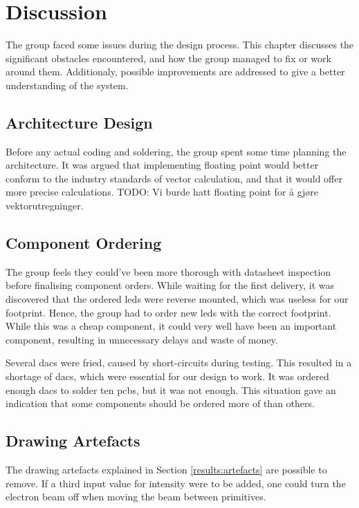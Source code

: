 \chapter{Discussion}

The group faced some issues during the design process. 
This chapter discusses the significant obstacles encountered, and how the group managed to fix or work around them. 
Additionaly, possible improvements are addressed to give a better understanding of the system.

\section{Architecture Design}
Before any actual coding and soldering, the group spent some time planning the architecture.
It was argued that implementing floating point would better conform to the industry standards of vector calculation, and that it would offer more precise calculations.
TODO: Vi burde hatt floating point for å gjøre vektorutregninger.



\section{Component Ordering}
The group feels they could've been more thorough with datasheet inspection before finalising component orders. 
While waiting for the first delivery, it was discovered that the ordered \gls{led}s were reverse mounted, which was useless for our footprint. 
Hence, the group had to order new \gls{led}s with the correct footprint. 
While this was a cheap component, it could very well have been an important component, resulting in unnecessary delays and waste of money.

Several \gls{dac}s were fried, caused by short-circuits during testing. 
This resulted in a shortage of \gls{dac}s, which were essential for our design to work.
It was ordered enough \gls{dac}s to solder ten \gls{pcb}s, but it was not enough. 
This situation gave an indication that some components should be ordered more of than others.



\section{Drawing Artefacts}
\label{discussion:artefacts}
The drawing artefacts explained in Section \ref{results:artefacts} are possible to remove.
If a third input value for intensity were to be added, one could turn the electron beam off when moving the beam between primitives.

